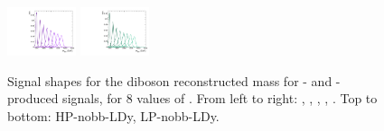 \begin{figure}[htbp]
  \includegraphics[width=0.18\textwidth]{fig/2Dfit/templateSignalVsMX_fromDC_WprToWZ_MVV_mu_LP_nobb_LDy.pdf}
  \includegraphics[width=0.18\textwidth]{fig/2Dfit/templateSignalVsMX_fromDC_WprToWH_MVV_mu_LP_nobb_LDy.pdf}\\
  \caption{
    Signal shapes for the diboson reconstructed mass \MVV for \ggF- and \DY-produced signals, for 8 values of \MX.
    From left to right: \GBulktoWW, \RadtoWW, \ZprtoWW, \WprtoWZ, \WprtoWH.
    Top to bottom: HP-nobb-LDy, LP-nobb-LDy.
  }
  \label{fig:MVVShapes_NonVBF_LDy_Run2}
\end{figure}

